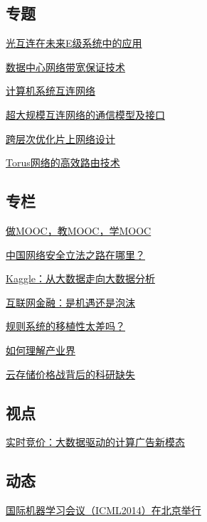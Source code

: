 \documentclass[a4paper]{article}
\begin{document}
\subsection{专题}
\href{http://history.ccf.org.cn/resources/1190201776262/2014/08/13/3.pdf}{光互连在未来E级系统中的应用}

\href{http://history.ccf.org.cn/resources/1190201776262/2014/08/13/4.pdf}{数据中心网络带宽保证技术}

\href{http://history.ccf.org.cn/resources/1190201776262/2014/08/13/0.pdf}{计算机系统互连网络}

\href{http://history.ccf.org.cn/resources/1190201776262/2014/08/13/2.pdf}{超大规模互连网络的通信模型及接口}

\href{http://history.ccf.org.cn/resources/1190201776262/2014/08/13/1.pdf}{跨层次优化片上网络设计}

\href{http://history.ccf.org.cn/resources/1190201776262/2014/08/13/5.pdf}{Torus网络的高效路由技术}

\subsection{专栏}
\href{http://history.ccf.org.cn/resources/1190201776262/2014/08/13/12.pdf}{做MOOC，教MOOC，学MOOC}

\href{http://history.ccf.org.cn/resources/1190201776262/2014/08/13/11.pdf}{中国网络安全立法之路在哪里？}

\href{http://history.ccf.org.cn/resources/1190201776262/2014/08/13/8.pdf}{Kaggle：从大数据走向大数据分析}

\href{http://history.ccf.org.cn/resources/1190201776262/2014/08/13/10.pdf}{互联网金融：是机遇还是泡沫}

\href{http://history.ccf.org.cn/resources/1190201776262/2014/08/13/7.pdf}{规则系统的移植性太差吗？}

\href{http://history.ccf.org.cn/resources/1190201776262/2014/08/13/9.pdf}{如何理解产业界}

\href{http://history.ccf.org.cn/resources/1190201776262/2014/08/13/6.pdf}{云存储价格战背后的科研缺失}

\subsection{视点}
\href{http://history.ccf.org.cn/resources/1190201776262/2014/08/13/13.pdf}{实时竞价：大数据驱动的计算广告新模态}

\subsection{动态}
\href{http://history.ccf.org.cn/resources/1190201776262/2014/08/13/15.pdf}{国际机器学习会议（ICML2014）在北京举行}
\end{document}
